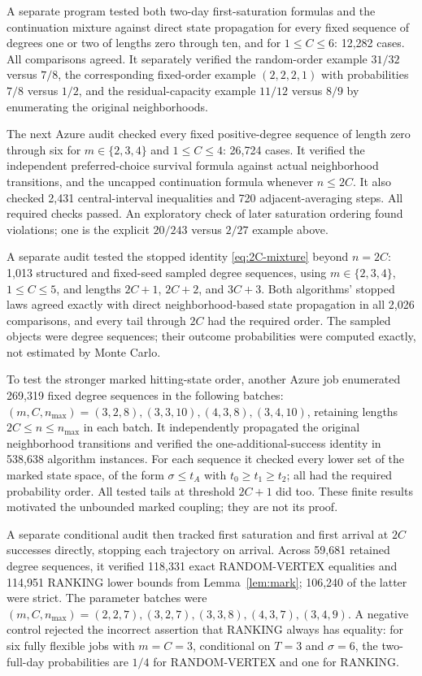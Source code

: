 \documentclass[11pt]{article}
\begin{document}
A separate program tested both two-day first-saturation formulas and
the continuation mixture against direct state propagation for every
fixed sequence of degrees one or two of lengths zero through ten, and
for $1\leq C\leq6$: 12,282 cases. All comparisons agreed. It separately
verified the random-order example $31/32$ versus $7/8$, the corresponding
fixed-order example $(2,2,2,1)$ with probabilities $7/8$ versus $1/2$,
and the residual-capacity example $11/12$ versus $8/9$ by enumerating
the original neighborhoods.

The next Azure audit checked every fixed positive-degree sequence of
length zero through six for $m\in\{2,3,4\}$ and $1\leq C\leq4$:
26,724 cases. It verified the independent preferred-choice survival formula
against actual neighborhood transitions, and the uncapped continuation
formula whenever $n\leq2C$. It also checked 2,431 central-interval
inequalities and 720 adjacent-averaging steps. All required checks passed.
An exploratory check of later saturation ordering found violations;
one is the explicit $20/243$ versus $2/27$ example above.

A separate audit tested the stopped identity \eqref{eq:2C-mixture} beyond
$n=2C$: 1,013 structured and fixed-seed sampled degree sequences, using
$m\in\{2,3,4\}$, $1\leq C\leq5$, and lengths $2C+1$, $2C+2$, and
$3C+3$. Both algorithms' stopped laws agreed exactly with direct
neighborhood-based state propagation in all 2,026 comparisons, and every
tail through $2C$ had the required order. The sampled objects were degree
sequences; their outcome probabilities were computed exactly, not estimated
by Monte Carlo.

To test the stronger marked hitting-state order, another Azure job
enumerated 269,319 fixed degree sequences in the following batches:
$(m,C,n_{\max})=(3,2,8),(3,3,10),(4,3,8),(3,4,10)$,
retaining lengths $2C\leq n\leq n_{\max}$ in each batch. It independently
propagated the original neighborhood transitions and verified the
one-additional-success identity in 538,638 algorithm instances.
For each sequence it checked every lower set of the marked state space,
of the form $\sigma\leq t_A$ with $t_0\geq t_1\geq t_2$; all had the
required probability order. All tested tails at threshold $2C+1$ did too.
These finite results motivated the unbounded marked coupling; they are
not its proof.

A separate conditional audit then tracked first saturation and first
arrival at $2C$ successes directly, stopping each trajectory on arrival.
Across 59,681 retained degree sequences, it verified 118,331 exact
RANDOM-VERTEX equalities and 114,951 RANKING lower bounds from
Lemma~\ref{lem:mark}; 106,240 of the latter were strict.
The parameter batches were $(m,C,n_{\max})=(2,2,7),(3,2,7),(3,3,8),
(4,3,7),(3,4,9)$. A negative control rejected the incorrect assertion
that RANKING always has equality: for six fully flexible jobs with
$m=C=3$, conditional on $T=3$ and $\sigma=6$, the two-full-day
probabilities are $1/4$ for RANDOM-VERTEX and one for RANKING.
\end{document}
